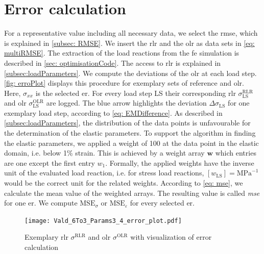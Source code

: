 \newpage
\section{Error calculation}\label{sec: errorCalculation}
For a representative value including all necessary data, we select the \acrshort{rmse}, which is explained in \autoref{subsec: RMSE}.
We insert the \acrlong{rlr} and the \acrlong{olr} as data sets in \autoref{eq: multiRMSE}.
The extraction of the load reactions from the \acrshort{fe} simulation is described in \autoref{sec: optimisationCode}.
The access to \acrlong{rlr} is explained in \autoref{subsec:loadParameters}.
We compute the deviations of the \acrlong{olr} at each load step. \autoref{fig: erroPlot} displays this procedure for exemplary sets of reference and \acrlong{olr}. Here, $\sigma_{xx}$ is the selected \acrlong{er}.
For every load step LS their corresponding \acrfull{rlr} $\sigma_{\scriptscriptstyle\text{LS}}^{\scriptscriptstyle\text{RLR}}$ and \acrfull{olr} $\sigma_{\scriptscriptstyle\text{LS}}^{\scriptscriptstyle\text{OLR}}$ are logged. The blue arrow highlights the deviation $\Delta\sigma_{\scriptscriptstyle\text{LS}}$ for one exemplary load step, according to \autoref{eq: EMDifference}. 
As described in \autoref{subsec:loadParameters}, the distribution of the data points is unfavourable for the determination of the elastic parameters. 
To support the algorithm in finding the elastic parameters, we applied a weight of 100 at the data point in the elastic domain, i.e. below 1\% strain. This is achieved by a weight array $\boldsymbol{w}$ which entries are one except the first entry $w_{\scriptscriptstyle\text{1}}$. Formally, the applied weights have the inverse unit of the evaluated load reaction, i.e. for stress load reactions, $[w_{\text{LS}}] = \text{MPa}^{-1}$ would be the correct unit for the related weights.
According to \autoref{eq: mse}, we calculate the mean value of the weighted arrays.
The resulting value is called \emph{\acrfull{mse}} for one \acrlong{er}. We compute $\text{MSE}_{\sigma}$ or $\text{MSE}_{\varepsilon}$ for every selected \acrlong{er}. 

\begin{figure}[H]
    \centering
    \texttt{[image: Vald\_6To3\_Params3\_4\_error\_plot.pdf]}
    \caption{Exemplary \acrlong{rlr} $\sigma^{\scriptscriptstyle\text{RLR}}$ and \acrlong{olr} $\sigma^{\scriptscriptstyle\text{OLR}}$ with visualization of error calculation}
    \label{fig: erroPlot}
\end{figure}

